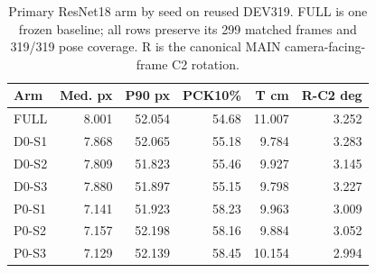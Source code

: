 \begin{table}[t]\centering\small
\caption{Primary ResNet18 arm by seed on reused DEV319. FULL is one frozen baseline; all rows preserve its 299 matched frames and 319/319 pose coverage. R is the canonical MAIN camera-facing-frame C2 rotation.}\label{tab:resnetfull}
\begin{tabular}{lrrrrr}\toprule
Arm & Med. px & P90 px & PCK10\% & T cm & R-C2 deg\\\midrule
FULL & 8.001 & 52.054 & 54.68 & 11.007 & 3.252\\
D0-S1 & 7.868 & 52.065 & 55.18 & 9.784 & 3.283\\
D0-S2 & 7.809 & 51.823 & 55.46 & 9.927 & 3.145\\
D0-S3 & 7.880 & 51.897 & 55.15 & 9.798 & 3.227\\
P0-S1 & 7.141 & 51.923 & 58.23 & 9.963 & 3.009\\
P0-S2 & 7.157 & 52.198 & 58.16 & 9.884 & 3.052\\
P0-S3 & 7.129 & 52.139 & 58.45 & 10.154 & 2.994\\
\bottomrule\end{tabular}
\end{table}
